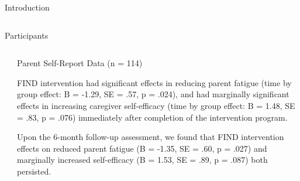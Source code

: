 \documentclass[final]{beamer}
\newlength{\sepwidth}
\newlength{\colwidth}
\newcommand{\separatorcolumn}{\begin{column}{\sepwidth}\end{column}}
\begin{document}
\begin{frame}[t]
\begin{columns}[t]
\begin{column}{\textwidth}
\begin{block}{Introduction}
\begin{columns}[t]
\begin{column}{0.48\textwidth}
\begin{block}{Participants}

          \end{block}
      \end{column}
    \end{columns}
  \end{block}
\end{column}
\end{columns}

\vspace{0cm} %
\begin{columns}[t]
\separatorcolumn

\begin{column}{\colwidth}
  \begin{block}{Parent Self-Report Data (n = 114)}
    
    FIND intervention had significant effects in reducing parent fatigue (time by group effect: B = -1.29, SE = .57, p = .024), and had marginally significant effects in increasing caregiver self-efficacy (time by group effect: B = 1.48, SE = .83, p = .076) immediately after completion of the intervention program. 
    
    Upon the 6-month follow-up assessment, we found that FIND intervention effects on reduced parent fatigue (B = -1.35, SE = .60, p = .027) and marginally increased self-efficacy (B = 1.53, SE = .89, p = .087) both persisted. 
    

\end{block}
\end{column}
\end{columns}
\end{frame}
\end{document}
